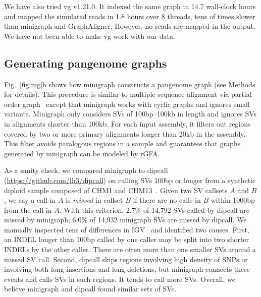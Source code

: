 \documentclass[twocolumn]{bmcart}
\begin{document}
We have also tried vg v1.21.0. It indexed the same graph in 14.7 wall-clock
hours and mapped the simulated reads in 1.8 hours over 8 threads, tens of times
slower than minigraph and GraphAligner. However, no reads are mapped in the
output. We have not been able to make vg work with our data.

\subsection*{Generating pangenome graphs}

Fig.~\ref{fig:mg}b shows how minigraph constructs a pangenome graph (see
Methods for details). This procedure is similar to multiple sequence alignment
via partial order graph~\cite{Lee_2002} except that minigraph works with cyclic
graphs and ignores small variants. Minigraph only considers SVs of
100bp--100kb in length and ignores SVs in alignments shorter than 100kb.
For each input assembly, it filters out regions covered by two or more primary
alignments longer than 20kb in the assembly. This filter avoids paralogous
regions in a sample and guarantees that graphs generated by minigraph can be
modeled by rGFA.

As a sanity check, we compared minigraph to dipcall
(\href{https://github.com/lh3/dipcall}{https://github.com/lh3/dipcall}) on
calling SVs 100bp or longer from a synthetic diploid sample composed of CHM1
and CHM13~\cite{Li:2018aa}. Given two SV callsets $A$ and $B$, we say a call in
$A$ is \emph{missed} in callset $B$ if there are no calls in $B$ within 1000bp
from the call in $A$. With this criterion, 2.7\% of 14,792 SVs called by
dipcall are missed by minigraph; 6.0\% of 14,932 minigraph SVs are missed by
dipcall. We manually inspected tens of differences in
IGV~\cite{Robinson:2011aa} and identified two causes. First, an INDEL longer
than 100bp called by one caller may be split into two shorter INDELs by the
other caller. There are often more than one smaller SVs around a missed SV
call. Second, dipcall skips regions involving high density of SNPs or involving
both long insertions and long deletions, but minigraph connects these events
and calls SVs in such regions. It tends to call more SVs. Overall, we believe
minigraph and dipcall found similar sets of SVs.
\end{document}

